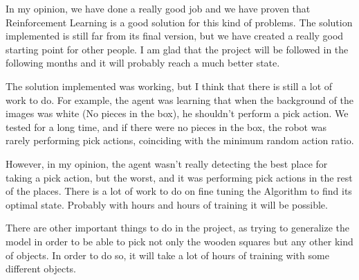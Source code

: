 	In my opinion, we have done a really good job and we have proven that Reinforcement Learning is a good solution for this kind of problems. The solution implemented is still far from its final version, but we have created a really good starting point for other people. I am glad that the project will be followed in the following months and it will probably reach a much better state.
	
	The solution implemented was working, but I think that there is still a lot of work to do. For example, the agent was learning that when the background of the images was white (No pieces in the box), he shouldn't perform a pick action. We tested for a long time, and if there were no pieces in the box, the robot was rarely performing pick actions, coinciding with the minimum random action ratio.
	
	However, in my opinion, the agent wasn't really detecting the best place for taking a pick action, but the worst, and it was performing pick actions in the rest of the places. There is a lot of work to do on fine tuning the Algorithm to find its optimal state. Probably with hours and hours of training it will be possible.
	
	There are other important things to do in the project, as trying to generalize the model in order to be able to pick not only the wooden squares but any other kind of objects. In order to do so, it will take a lot of hours of training with some different objects.